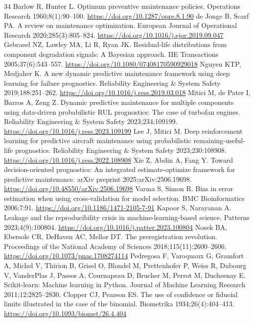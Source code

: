 \documentclass[a4paper,fleqn,doubleblind]{cas-dc}
\begin{document}
\begin{thebibliography}{34}
 Barlow R, Hunter L. Optimum preventive maintenance policies. Operations Research 1960;8(1):90--100. \url{https://doi.org/10.1287/opre.8.1.90}
 de Jonge B, Scarf PA. A review on maintenance optimization. European Journal of Operational Research 2020;285(3):805--824. \url{https://doi.org/10.1016/j.ejor.2019.09.047}
 Gebraeel NZ, Lawley MA, Li R, Ryan JK. Residual-life distributions from component degradation signals: A Bayesian approach. IIE Transactions 2005;37(6):543--557. \url{https://doi.org/10.1080/07408170590929018}
 Nguyen KTP, Medjaher K. A new dynamic predictive maintenance framework using deep learning for failure prognostics. Reliability Engineering \& System Safety 2019;188:251--262. \url{https://doi.org/10.1016/j.ress.2019.03.018}
 Mitici M, de Pater I, Barros A, Zeng Z. Dynamic predictive maintenance for multiple components using data-driven probabilistic RUL prognostics: The case of turbofan engines. Reliability Engineering \& System Safety 2023;234:109199. \url{https://doi.org/10.1016/j.ress.2023.109199}
 Lee J, Mitici M. Deep reinforcement learning for predictive aircraft maintenance using probabilistic remaining-useful-life prognostics. Reliability Engineering \& System Safety 2023;230:108908. \url{https://doi.org/10.1016/j.ress.2022.108908}
 Xie Z, Abdin A, Fang Y. Toward decision-oriented prognostics: An integrated estimate-optimize framework for predictive maintenance. arXiv preprint 2025;arXiv:2506.19698. \url{https://doi.org/10.48550/arXiv.2506.19698}
 Varma S, Simon R. Bias in error estimation when using cross-validation for model selection. BMC Bioinformatics 2006;7:91. \url{https://doi.org/10.1186/1471-2105-7-91}
 Kapoor S, Narayanan A. Leakage and the reproducibility crisis in machine-learning-based science. Patterns 2023;4(9):100804. \url{https://doi.org/10.1016/j.patter.2023.100804}
 Nosek BA, Ebersole CR, DeHaven AC, Mellor DT. The preregistration revolution. Proceedings of the National Academy of Sciences 2018;115(11):2600--2606. \url{https://doi.org/10.1073/pnas.1708274114}
 Pedregosa F, Varoquaux G, Gramfort A, Michel V, Thirion B, Grisel O, Blondel M, Prettenhofer P, Weiss R, Dubourg V, VanderPlas J, Passos A, Cournapeau D, Brucher M, Perrot M, Duchesnay E. Scikit-learn: Machine learning in Python. Journal of Machine Learning Research 2011;12:2825--2830.
 Clopper CJ, Pearson ES. The use of confidence or fiducial limits illustrated in the case of the binomial. Biometrika 1934;26(4):404--413. \url{https://doi.org/10.1093/biomet/26.4.404}

\end{thebibliography}
\end{document}
